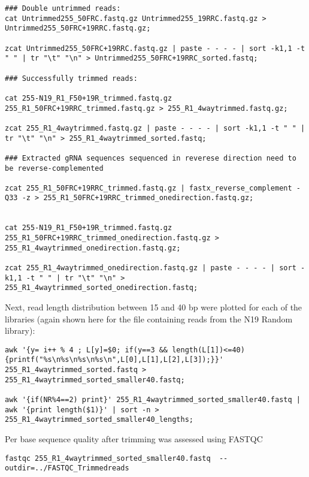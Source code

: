 \begin{lstlisting}
### Double untrimmed reads:
cat Untrimmed255_50FRC.fastq.gz Untrimmed255_19RRC.fastq.gz > Untrimmed255_50FRC+19RRC.fastq.gz;

zcat Untrimmed255_50FRC+19RRC.fastq.gz | paste - - - - | sort -k1,1 -t " " | tr "\t" "\n" > Untrimmed255_50FRC+19RRC_sorted.fastq;

### Successfully trimmed reads:

cat 255-N19_R1_F50+19R_trimmed.fastq.gz 255_R1_50FRC+19RRC_trimmed.fastq.gz > 255_R1_4waytrimmed.fastq.gz;

zcat 255_R1_4waytrimmed.fastq.gz | paste - - - - | sort -k1,1 -t " " | tr "\t" "\n" > 255_R1_4waytrimmed_sorted.fastq;

### Extracted gRNA sequences sequenced in reverese direction need to be reverse-complemented

zcat 255_R1_50FRC+19RRC_trimmed.fastq.gz | fastx_reverse_complement -Q33 -z > 255_R1_50FRC+19RRC_trimmed_onedirection.fastq.gz;


cat 255-N19_R1_F50+19R_trimmed.fastq.gz 255_R1_50FRC+19RRC_trimmed_onedirection.fastq.gz > 255_R1_4waytrimmed_onedirection.fastq.gz;

zcat 255_R1_4waytrimmed_onedirection.fastq.gz | paste - - - - | sort -k1,1 -t " " | tr "\t" "\n" > 255_R1_4waytrimmed_sorted_onedirection.fastq;
\end{lstlisting}


Next, read length distribution between 15 and 40 bp were plotted for each of the libraries (again shown here for the file containing reads from the N19 Random library):

\begin{lstlisting}
awk '{y= i++ % 4 ; L[y]=$0; if(y==3 && length(L[1])<=40) {printf("%s\n%s\n%s\n%s\n",L[0],L[1],L[2],L[3]);}}' 255_R1_4waytrimmed_sorted.fastq > 255_R1_4waytrimmed_sorted_smaller40.fastq;

awk '{if(NR%4==2) print}' 255_R1_4waytrimmed_sorted_smaller40.fastq | awk '{print length($1)}' | sort -n >  255_R1_4waytrimmed_sorted_smaller40_lengths;
\end{lstlisting}


Per base sequence quality after trimming was assessed using FASTQC \cite{FASTQC:Online}

\begin{lstlisting}
fastqc 255_R1_4waytrimmed_sorted_smaller40.fastq  --outdir=../FASTQC_Trimmedreads
\end{lstlisting}



